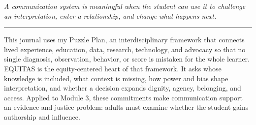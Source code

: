\documentclass[11pt]{article}
\begin{document}
\begin{titlepage}
\vfill

\begin{center}
\begin{minipage}{0.92\textwidth}
\centering\itshape
A communication system is meaningful when the student can use it to challenge an interpretation, enter a relationship, and change what happens next.\\
{\color{PrimaryRed}\rule{4.5in}{0.8pt}}
\end{minipage}
\end{center}

\vfill

\begin{center}
\begin{minipage}{0.95\textwidth}
\small
This journal uses my Puzzle Plan, an interdisciplinary framework that connects lived experience, education, data, research, technology, and advocacy so that no single diagnosis, observation, behavior, or score is mistaken for the whole learner. EQUITAS is the equity-centered heart of that framework. It asks whose knowledge is included, what context is missing, how power and bias shape interpretation, and whether a decision expands dignity, agency, belonging, and access. Applied to Module 3, these commitments make communication support an evidence-and-justice problem: adults must examine whether the student gains authorship and influence.
\end{minipage}
\end{center}

\restoregeometry
\end{titlepage}
\hypersetup{pageanchor=true}






\clearpage
\footnotesize

\end{document}
